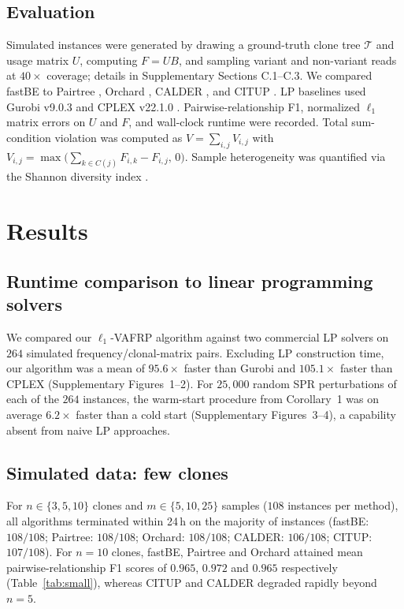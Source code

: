 \documentclass[11pt]{article}
\begin{document}
\subsection{Evaluation}
Simulated instances were generated by drawing a ground-truth clone tree $\mathcal{T}$ and usage matrix $U$, computing $F = UB$, and sampling variant and non-variant reads at $40\times$ coverage; details in Supplementary Sections C.1--C.3. We compared fastBE to Pairtree \cite{wintersinger2022pairtree}, Orchard \cite{kulman2024orchard}, CALDER \cite{myers2022calder}, and CITUP \cite{malikic2015citup}. LP baselines used Gurobi v9.0.3 \cite{gurobi2020} and CPLEX v22.1.0 \cite{cplex2022}. Pairwise-relationship F1, normalized $\ell_1$ matrix errors on $U$ and $F$, and wall-clock runtime were recorded. Total sum-condition violation was computed as $V = \sum_{i,j} V_{i,j}$ with $V_{i,j} = \max\bigl(\sum_{k \in C(j)} F_{i,k} - F_{i,j},\, 0\bigr)$. Sample heterogeneity was quantified via the Shannon diversity index \cite{shannon1948}.

\section{Results}

\subsection{Runtime comparison to linear programming solvers}
We compared our $\ell_1$-VAFRP algorithm against two commercial LP solvers on $264$ simulated frequency/clonal-matrix pairs. Excluding LP construction time, our algorithm was a mean of $95.6\times$ faster than Gurobi and $105.1\times$ faster than CPLEX (Supplementary Figures~1--2). For $25{,}000$ random SPR perturbations of each of the $264$ instances, the warm-start procedure from Corollary~1 was on average $6.2\times$ faster than a cold start (Supplementary Figures~3--4), a capability absent from naive LP approaches.

\subsection{Simulated data: few clones}
For $n \in \{3,5,10\}$ clones and $m \in \{5,10,25\}$ samples ($108$ instances per method), all algorithms terminated within 24\,h on the majority of instances (fastBE: $108/108$; Pairtree: $108/108$; Orchard: $108/108$; CALDER: $106/108$; CITUP: $107/108$). For $n=10$ clones, fastBE, Pairtree and Orchard attained mean pairwise-relationship F1 scores of $0.965$, $0.972$ and $0.965$ respectively (Table~\ref{tab:small}), whereas CITUP and CALDER degraded rapidly beyond $n=5$.
\end{document}
